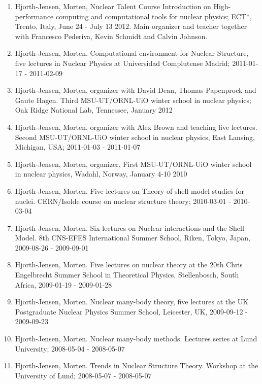 \documentclass[%
oneside,                 %
final,                   %
10pt]{article}
\begin{document}
\begin{enumerate}
\item Hjorth-Jensen, Morten, Nuclear Talent Course  Introduction on High-performance computing and computational tools for nuclear physics; ECT*, Trento, Italy, June 24 - July 13 2012. Main organizer and teacher together with Francesco Pederiva, Kevin Schmidt and Calvin Johnson. 

\item Hjorth-Jensen, Morten. Computational environment for Nuclear Structure, five lectures in Nuclear Physics at Universidad Complutense Madrid; 2011-01-17 - 2011-02-09

\item Hjorth-Jensen, Morten, organizer with David Dean, Thomas Papenprock and Gaute Hagen. Third MSU-UT/ORNL-UiO winter school in nuclear physics; Oak Ridge National Lab, Tennessee, January 2012

\item Hjorth-Jensen, Morten, organizer with Alex Brown and teaching five lectures. Second MSU-UT/ORNL-UiO winter school in nuclear physics, East Lansing, Michigan, USA; 2011-01-03 - 2011-01-07

\item Hjorth-Jensen, Morten, organizer, First MSU-UT/ORNL-UiO winter school in nuclear physics, Wadahl, Norway, January 4-10 2010

\item Hjorth-Jensen, Morten.  Five lectures on Theory of shell-model studies for nuclei. CERN/Isolde course on nuclear structure theory; 2010-03-01 - 2010-03-04

\item Hjorth-Jensen, Morten.  Six lectures on Nuclear interactions and the Shell Model. 8th CNS-EFES International Summer School, Riken, Tokyo, Japan, 2009-08-26 - 2009-09-01

\item Hjorth-Jensen, Morten.  Five lectures on nuclear theory at the  20th Chris Engelbrecht Summer School in Theoretical Physics, Stellenbosch, South Africa,  2009-01-19 - 2009-01-28

\item Hjorth-Jensen, Morten.  Nuclear many-body theory, five lectures at the  UK Postgraduate Nuclear Physics Summer School, Leicester, UK,  2009-09-12 - 2009-09-23

\item Hjorth-Jensen, Morten.  Nuclear many-body methods. Lectures series at Lund University; 2008-05-04 - 2008-05-07

\item Hjorth-Jensen, Morten.  Trends in Nuclear Structure Theory. Workshop at the University of Lund; 2008-05-07 - 2008-05-07


\end{enumerate}
\end{document}
